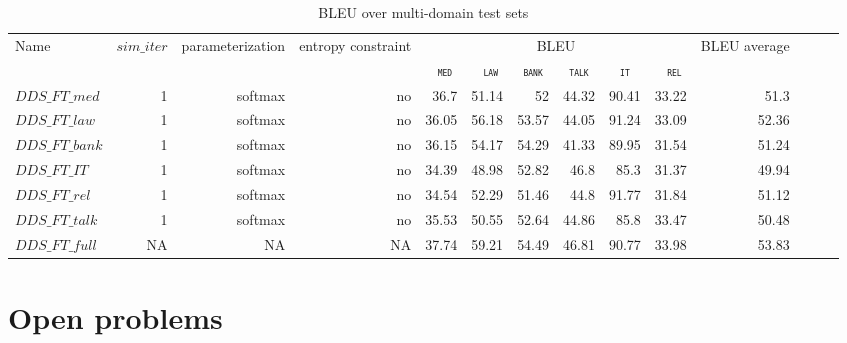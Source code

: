 \documentclass[12pt,times,a4paper,twoside]{article}
\newcommand{\domain}[1]{\texttt{\textsc{#1}}}
\newcommand{\system}[1]{\texttt{{#1}}}
\theoremstyle{definition}
\begin{document}
\begin{table}[htb]
  \centering%
  \begin{adjustbox}{width=1.0\columnwidth,center}
  \begin{tabular}{|p{3.0cm}|*{13}{r|}} \hline
    \multirow{2}{*}{Name} & \multirow{2}{*}{$sim\_iter$} & \multirow{2}{*}{parameterization} & \multirow{2}{*}{entropy constraint} & \multicolumn{6}{|c|}{BLEU} & \multirow{2}{*}{BLEU average} \\ \cline{5-10}	
   & & & & \multicolumn{1}{c|}{\domain{ med}} & \multicolumn{1}{c|}{\domain{ law}} & \multicolumn{1}{c|}{\domain{bank}} & \multicolumn{1}{c|}{\domain{talk}} & \multicolumn{1}{c|}{\domain{ it }} & \multicolumn{1}{c|}{\domain{ rel}} &  \\
    \hline
  \system{$DDS\_FT\_med$} & 1 & softmax & no & 36.7&51.14&52&44.32&90.41&33.22&51.3\\
  \system{$DDS\_FT\_law$} & 1 & softmax & no &36.05&56.18&53.57&44.05&91.24&33.09&52.36\\
  \system{$DDS\_FT\_bank$} & 1 & softmax & no &36.15&54.17&54.29&41.33&89.95&31.54&51.24 \\
  \system{$DDS\_FT\_IT$} & 1 & softmax & no &34.39&48.98&52.82&46.8&85.3&31.37&49.94 \\
  \system{$DDS\_FT\_rel$} & 1 & softmax & no & 34.54&52.29&51.46&44.8&91.77&31.84&51.12\\
  \system{$DDS\_FT\_talk$} & 1 & softmax & no & 35.53&50.55&52.64&44.86&85.8&33.47&50.48\\
  \system{$DDS\_FT\_full$} & NA & NA & NA & 37.74&59.21	&54.49&46.81&90.77&33.98&53.83\\
  \hline
  \end{tabular}
  \end{adjustbox}
  \caption{BLEU over multi-domain test sets}
  \label{tab:ft}
\end{table}


\section{Open problems}
\end{document}
